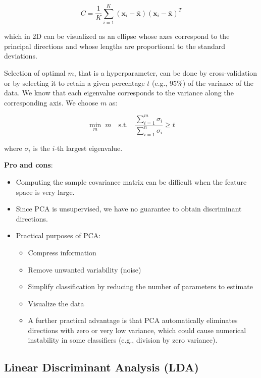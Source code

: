 \begin{equation*}
C = \frac{1}{K}\sum_{i=1}^{K} (\mathbf{x}_i - \bar{\mathbf{x}})(\mathbf{x}_i - \bar{\mathbf{x}})^T
\end{equation*}

which in 2D can be visualized as an ellipse whose axes correspond to the principal directions and whose lengths are proportional to the standard deviations.

Selection of optimal $m$, that is a hyperparameter, can be done by cross-validation or by selecting it to retain a given percentage $t$ (e.g., 95\%) of the variance of the data. We know that each eigenvalue corresponds to the variance along the corresponding axis. We choose $m$ as:

\begin{equation*}
\min_m \; m \quad \text{s.t.} \quad \frac{\sum_{i=1}^{m} \sigma_i}{\sum_{i=1}^{n} \sigma_i} \geq t
\end{equation*}

where $\sigma_i$ is the $i$-th largest eigenvalue.

\textbf{Pro and cons}:
\begin{itemize}
	\item Computing the sample covariance matrix can be difficult when the feature space is very large.
	\item Since PCA is unsupervised, we have no guarantee to obtain discriminant directions.
	\item Practical purposes of PCA:
	\begin{itemize}
		\item Compress information
		\item Remove unwanted variability (noise)
		\item Simplify classification by reducing the number of parameters to estimate
		\item Visualize the data
		\item A further practical advantage is that PCA automatically eliminates directions with zero or very low variance, which could cause numerical instability in some classifiers (e.g., division by zero variance).
	\end{itemize}
\end{itemize}


\newpage
\subsection{Linear Discriminant Analysis (LDA)}

